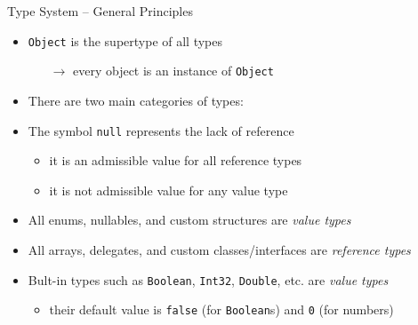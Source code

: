 \documentclass[presentation]{beamer}
\begin{document}
\begin{frame}{\dotnet Type System -- General Principles}
    \begin{itemize}
        \item \texttt{Object} is the supertype of all types
        \begin{itemize}
            \item[$\rightarrow$] every object is an instance of \texttt{Object}
        \end{itemize}

        \vfill

        \item There are two main categories of types: %

        \vfill

        \item The symbol \alert{\texttt{null}} represents the lack of reference
        \begin{itemize}
            \item it is an admissible value for \alert{all} reference types
            \item it is \alert{not} admissible value for \alert{any} value type
        \end{itemize}

        \vfill

        \item All enums, nullables, and \alert{custom structures} are \emph{value types}       
        
        \vfill

        \item All arrays, delegates, and \alert{custom classes/interfaces} are \emph{reference types}
        
        \vfill

        \item Bult-in types such as \texttt{Boolean}, \texttt{Int32}, \texttt{Double}, etc. are \emph{value types}  
        \begin{itemize}
            \item their default value is \texttt{false} (for \texttt{Boolean}s) and \texttt{0} (for numbers)
        \end{itemize}
        

\end{itemize}
\end{frame}
\end{document}
